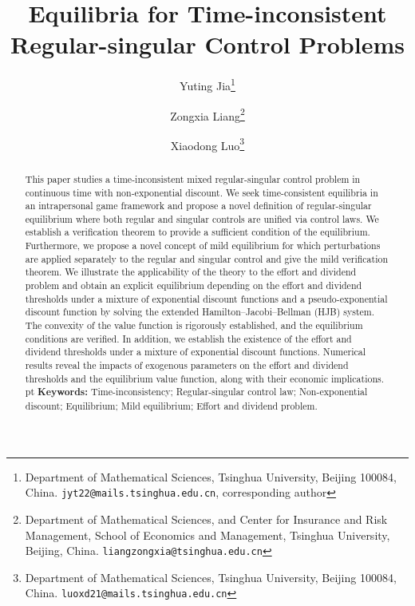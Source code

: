 \documentclass[11pt,reqno]{article}%
\numberwithin{equation}{section}
\begin{document}
\makeatletter
\def\@setauthors{%
\begingroup
\def\thanks{\protect\thanks@warning}%
\trivlist \centering\footnotesize \@topsep30\p@\relax
\advance\@topsep by -\baselineskip
\item\relax
\author@andify\authors
\def\\{\protect\linebreak}%
{\authors}%
\ifx\@empty\contribs \else ,\penalty-3 \space \@setcontribs
\@closetoccontribs \fi
\endtrivlist
\endgroup } \makeatother
 \baselineskip 12pt

\title{Equilibria for Time-inconsistent Regular-singular Control Problems}
\date{}
\author{
Yuting Jia\thanks{
\scriptsize Department of Mathematical Sciences, Tsinghua University, Beijing 100084, China. \texttt{jyt22@mails.tsinghua.edu.cn}, corresponding author}
\and
Zongxia Liang\thanks{\scriptsize 
    Department of Mathematical Sciences, and Center for Insurance and Risk Management, School of Economics and Management,  Tsinghua University, Beijing, China. \texttt{liangzongxia@tsinghua.edu.cn}}
 \and
 Xiaodong Luo\thanks{
\scriptsize Department of Mathematical Sciences, Tsinghua University, Beijing 100084, China. \texttt{luoxd21@mails.tsinghua.edu.cn}}}
\maketitle
\begin{abstract}
This paper studies a time-inconsistent mixed regular-singular control problem in continuous time with non-exponential discount. We seek time-consistent equilibria in an intrapersonal game framework and propose a novel definition of regular-singular equilibrium where both regular and singular controls are unified via control laws. We establish a verification theorem to provide a sufficient condition of the equilibrium. Furthermore, we propose a novel concept of mild equilibrium for which perturbations are applied separately to the regular and singular control and give the mild verification theorem. We illustrate the applicability of the theory to the effort and dividend problem and obtain an explicit equilibrium depending on the effort and dividend thresholds under a mixture of exponential discount functions and a pseudo-exponential discount function by solving the extended Hamilton--Jacobi--Bellman (HJB) system. The convexity of the value function is rigorously established, and the equilibrium conditions are verified. In addition, we establish the existence of the effort and dividend thresholds under a mixture of exponential discount functions. Numerical results reveal the impacts of exogenous parameters on the effort and dividend thresholds and the equilibrium value function, along with their economic implications.
 pt \noindent
\textbf{Keywords:} Time-inconsistency; Regular-singular control law; Non-exponential discount; Equilibrium; Mild equilibrium; Effort and dividend problem.
\end{abstract}
\vskip15pt
\end{document}
